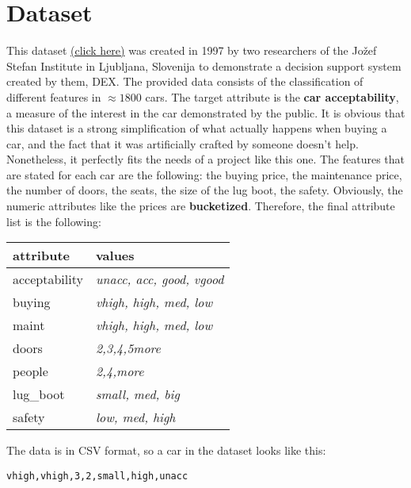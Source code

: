 \section{Dataset}
\label{sec:dataset}
This dataset \href{https://archive.ics.uci.edu/ml/datasets/Car+Evaluation}{(click here)} was created in 1997 by two researchers of the Jožef Stefan Institute in Ljubljana, Slovenija to demonstrate a decision support system created by them, DEX. The provided data consists of the classification of different features in $\approx 1800$ cars. The target attribute is the \textbf{car acceptability}, a measure of the interest in the car demonstrated by the public. It is obvious that this dataset is a strong simplification of what actually happens when buying a car, and the fact that it was artificially crafted by someone doesn't help. Nonetheless, it perfectly fits the needs of a project like this one. The features that are stated for each car are the following: the buying price, the maintenance price, the number of doors, the seats, the size of the lug boot, the safety. Obviously, the numeric attributes like the prices are \textbf{bucketized}. Therefore, the final attribute list is the following:
\begin{center}
\begin{tabular}{|l|l|}
\hline
\textbf{attribute} & \textbf{values}\\
\hline
acceptability & \textit{unacc, acc, good, vgood}\\
\hline
buying & \textit{vhigh, high, med, low}\\
\hline
maint & \textit{vhigh, high, med, low}\\
\hline
doors & \textit{2,3,4,5more}\\
\hline
people & \textit{2,4,more}\\
\hline
lug\_boot & \textit{small, med, big}\\
\hline
safety & \textit{low, med, high}\\
\hline
\end{tabular}
\end{center}
The data is in CSV format, so a car in the dataset looks like this:
\begin{center}
    \texttt{vhigh,vhigh,3,2,small,high,unacc}
\end{center}